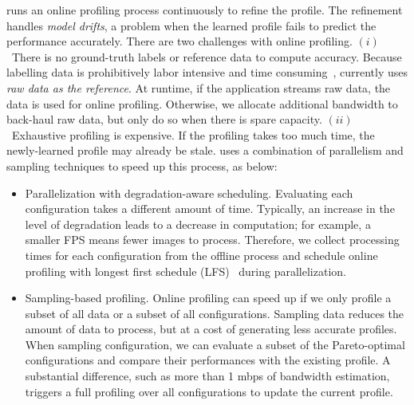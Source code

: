 
 \sysname{} runs an online profiling process
continuously to refine the profile. The refinement handles \textit{model
  drifts}, a problem when the learned profile fails to predict the performance
accurately. There are two challenges with online profiling.  $(i)$~There is no
ground-truth labels or reference data to compute accuracy. Because labelling
data is prohibitively labor intensive and time
consuming~\cite{russell2008labelme}, \sysname{} currently uses \textit{raw data as
the
reference}. At runtime, if the application streams raw data, the data is used for
online profiling. Otherwise, we allocate additional bandwidth to back-haul raw
data, but only do so when there is spare capacity. $(ii)$~Exhaustive profiling
is expensive. If the profiling takes too much time, the newly-learned profile
may already be stale. \sysname{} uses a combination of parallelism and sampling
techniques to speed up this process, as below:

\begin{itemize}[leftmargin=*, topsep=0pt, itemsep=0pt]

\item Parallelization with degradation-aware scheduling. Evaluating each
  configuration takes a different amount of time. Typically, an increase in the
  level of degradation leads to a decrease in computation; for example, a
  smaller FPS means fewer images to process. Therefore, we collect processing
  times for each configuration from the offline process and schedule online
  profiling with longest first schedule (LFS)~\cite{karger2010scheduling} during
  parallelization.

\item Sampling-based profiling. Online profiling can speed up if we only profile
  a subset of all data or a subset of all configurations.  Sampling data reduces
  the amount of data to process, but at a cost of generating less accurate
  profiles. When sampling configuration, we can evaluate a subset of the
  Pareto-optimal configurations and compare their performances with the existing
  profile. A substantial difference, such as more than 1 mbps of bandwidth
  estimation, triggers a full profiling over all configurations to update the
  current profile.

\end{itemize}

